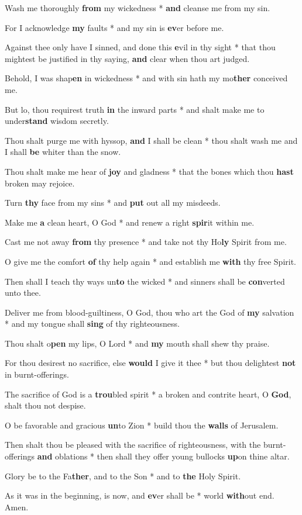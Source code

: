 \begin{multicols}{2}
	Wash me thoroughly \textbf{from} my wickedness * \textbf{and} cleanse me from my sin.
	
	For I acknowledge \textbf{my} faults * and my sin is \textbf{ev}er before me.
	
	Against thee only have I sinned, and done this \textbf{e}vil in thy sight * that thou mightest be justified in thy saying, \textbf{and} clear when thou art judged.
	
	Behold, I was shap\textbf{en} in wickedness * and with sin hath my mo\textbf{ther} conceived me.
	
	But lo, thou requirest truth \textbf{in} the inward parts * and shalt make me to under\textbf{stand} wisdom secretly.
	
	Thou shalt purge me with hyssop, \textbf{and} I shall be clean * thou shalt wash me and I shall \textbf{be} whiter than the snow.
	
	Thou shalt make me hear of \textbf{joy} and gladness * that the bones which thou \textbf{hast} broken may rejoice.
	
	Turn \textbf{thy} face from my sins * and \textbf{put} out all my misdeeds.
	
	Make me \textbf{a} clean heart, O God * and renew a right \textbf{spir}it within me.
	
	Cast me not away \textbf{from} thy presence * and take not thy Ho\textbf{ly} Spirit from me.
	
	O give me the comfort \textbf{of} thy help again * and establish me \textbf{with} thy free Spirit.
	
	Then shall I teach thy ways un\textbf{to} the wicked * and sinners shall be \textbf{con}verted unto thee.
	
	Deliver me from blood-guiltiness, O God, thou who art the God of \textbf{my} salvation * and my tongue shall \textbf{sing} of thy righteousness.
	
	Thou shalt o\textbf{pen} my lips, O Lord * and \textbf{my} mouth shall shew thy praise.
	
	For thou desirest no sacrifice, else \textbf{would} I give it thee * but thou delightest \textbf{not} in burnt-offerings.
	
	The sacrifice of God is a \textbf{trou}bled spirit * a broken and contrite heart, O \textbf{God}, shalt thou not despise.
	
	O be favorable and gracious \textbf{un}to Zion * build thou the \textbf{walls} of Jerusalem.
	
	Then shalt thou be pleased with the sacrifice of righteousness, with the burnt-offerings \textbf{and} oblations * then shall they offer young bullocks \textbf{up}on thine altar.
	
	Glory be to the Fa\textbf{ther}, and to the Son * and to \textbf{the} Holy Spirit.
	
	As it was in the beginning, is now, and \textbf{ev}er shall be * world \textbf{with}out end. Amen.
\end{multicols}